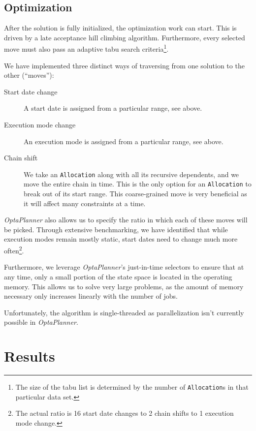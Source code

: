 \documentclass[10pt,a4paper]{article}
\begin{document}
\subsection{Optimization}

After the solution is fully initialized, the optimization work can start. This is driven by a late acceptance hill climbing algorithm. Furthermore, every selected move must also pass an adaptive tabu search criteria\footnote{The size of the tabu list is determined by the number of \texttt{Allocation}s in that particular data set.}.

We have implemented three distinct ways of traversing from one solution to the other (``moves''):

\begin{description}
\item[Start date change] A start date is assigned from a particular range, see above.
\item[Execution mode change] An execution mode is assigned from a particular range, see above.
\item[Chain shift] We take an \texttt{Allocation} along with all its recursive dependents, and we move the entire chain in time. This is the only option for an \texttt{Allocation} to break out of its start range. This coarse-grained move is very beneficial as it will affect many constraints at a time.
\end{description}

\textit{OptaPlanner} also allows us to specify the ratio in which each of these moves will be picked. Through extensive benchmarking, we have identified that while execution modes remain mostly static, start dates need to change much more often\footnote{The actual ratio is 16 start date changes to 2 chain shifts to 1 execution mode change.}.

Furthermore, we leverage \textit{OptaPlanner}'s just-in-time selectors to ensure that at any time, only a small portion of the state space is located in the operating memory. This allows us to solve very large problems, as the amount of memory necessary only increases linearly with the number of jobs.

Unfortunately, the algorithm is single-threaded as parallelization isn't currently possible in \textit{OptaPlanner}.

\section{Results}
\end{document}
